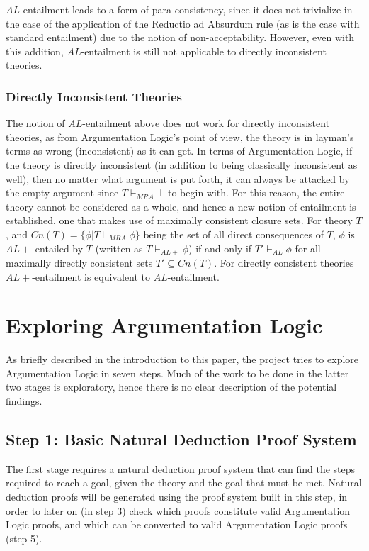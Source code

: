 \documentclass[11pt,twoside,a4paper]{report}
\begin{document}
$AL$-entailment leads to a form of para-consistency, since it does not trivialize in the case of the application of the Reductio ad Absurdum rule (as is the case with standard entailment) due to the notion of non-acceptability. However, even with this addition, $AL$-entailment is still not applicable to directly inconsistent theories.

\subsubsection{Directly Inconsistent Theories}
The notion of $AL$-entailment above does not work for directly inconsistent theories, as from Argumentation Logic's point of view, the theory is in layman's terms as wrong (inconsistent) as it can get. In terms of Argumentation Logic, if the theory is directly inconsistent (in addition to being classically inconsistent as well), then no matter what argument is put forth, it can always be attacked by the empty argument since $T\vdash_{MRA}\bot$ to begin with. 
For this reason, the entire theory cannot be considered as a whole, and hence a new notion of entailment is established, one that makes use of maximally consistent closure sets. For theory $T$, and $Cn(T) = \{\phi| T\vdash_{MRA}\phi\}$ being the set of all direct consequences of $T$, $\phi$ is $AL+$-entailed by $T$ (written as $T\vdash_{AL+}\phi$) if and only if $T'\vdash_{AL}\phi$ for all maximally directly consistent sets $T'\subseteq Cn(T)$. For directly consistent theories $AL+$-entailment is equivalent to $AL$-entailment. 

\section{Exploring Argumentation Logic}
As briefly described in the introduction to this paper, the project tries to explore Argumentation Logic in seven steps. Much of the work to be done in the latter two stages is exploratory, hence there is no clear description of the potential findings.

\subsection{Step 1: Basic Natural Deduction Proof System}
The first stage requires a natural deduction proof system that can find the steps required to reach a goal, given the theory and the goal that must be met. Natural deduction proofs will be generated using the proof system built in this step, in order to later on (in step 3) check which proofs constitute valid Argumentation Logic proofs, and which can be converted to valid Argumentation Logic proofs (step 5).
\end{document}
